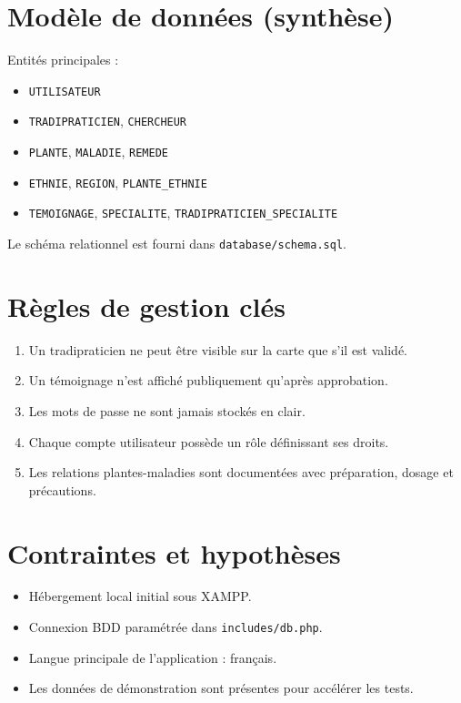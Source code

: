 \documentclass[12pt,a4paper]{article}
\begin{document}
\section{Modèle de données (synthèse)}
Entités principales :
\begin{itemize}[leftmargin=1.2cm]
  \item \texttt{UTILISATEUR}
  \item \texttt{TRADIPRATICIEN}, \texttt{CHERCHEUR}
  \item \texttt{PLANTE}, \texttt{MALADIE}, \texttt{REMEDE}
  \item \texttt{ETHNIE}, \texttt{REGION}, \texttt{PLANTE\_ETHNIE}
  \item \texttt{TEMOIGNAGE}, \texttt{SPECIALITE}, \texttt{TRADIPRATICIEN\_SPECIALITE}
\end{itemize}

Le schéma relationnel est fourni dans \texttt{database/schema.sql}.

\section{Règles de gestion clés}
\begin{enumerate}[leftmargin=1.2cm]
  \item Un tradipraticien ne peut être visible sur la carte que s'il est validé.
  \item Un témoignage n'est affiché publiquement qu'après approbation.
  \item Les mots de passe ne sont jamais stockés en clair.
  \item Chaque compte utilisateur possède un rôle définissant ses droits.
  \item Les relations plantes-maladies sont documentées avec préparation, dosage et précautions.
\end{enumerate}

\section{Contraintes et hypothèses}
\begin{itemize}[leftmargin=1.2cm]
  \item Hébergement local initial sous XAMPP.
  \item Connexion BDD paramétrée dans \texttt{includes/db.php}.
  \item Langue principale de l'application : français.
  \item Les données de démonstration sont présentes pour accélérer les tests.
\end{itemize}
\end{document}
